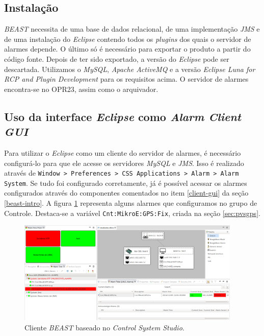 \subsection{Instalação}

\textit{BEAST} necessita de uma base de dados relacional, de uma implementação
\textit{JMS} e de uma instalação do \textit{Eclipse} contendo todos os
\textit{plugins} dos quais o servidor de alarmes depende. O último só é
necessário para exportar o produto a partir do código fonte. Depois
de ter sido exportado, a versão do \textit{Eclipse} pode ser
descartada. Utilizamos o \textit{MySQL}, \textit{Apache
ActiveMQ} e a versão \textit{Eclipse Luna for RCP and Plugin Development} para
os requisitos acima. O servidor de alarmes encontra-se no OPR23, assim
como o arquivador.


\subsection{Uso da interface \textit{Eclipse} como \textit{Alarm Client GUI}}

Para utilizar o \textit{Eclipse} como um cliente do servidor de alarmes, é
necessário configurá-lo para que ele acesse os servidores \textit{MySQL} e
\textit{JMS}. Isso é realizado através de \texttt{Window > Preferences > CSS
Applications > Alarm > Alarm System}. Se tudo foi configurado corretamente, já é
possível acessar os alarmes configurados através do componentes comentados no
item \ref{client-gui} da seção \ref{beast-intro}. A figura \ref{fig:alarm}
representa alguns alarmes que configuramos no grupo de Controle. Destaca-se a
variável \texttt{Cnt:MikroE:GPS:Fix}, criada na seção \ref{sec:pvsgps}.

\begin{figure}[h]
\centering
\includegraphics[width=0.95\textwidth]{image/beast-screen-shot}
\caption {Cliente \textit{BEAST} baseado no \textit{Control System Studio}.}
\label{fig:alarm}
\end{figure}

